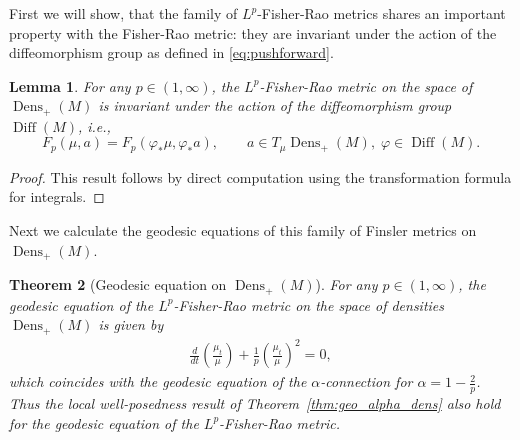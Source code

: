 \documentclass[11pt]{amsart}
\newtheorem{theorem}{Theorem}[section]
\newtheorem{lemma}[theorem]{Lemma}
\theoremstyle{definition}
\newcommand{\Dens}{\operatorname{Dens}_+(M)}
\newcommand{\Diff}{\operatorname{Diff}(M)}
\begin{document}
First we will show, that the family of $L^p$-Fisher-Rao metrics shares an important property with the Fisher-Rao metric: they are invariant under the action of the diffeomorphism group as defined in \eqref{eq:pushforward}.
\begin{lemma}\label{lem:invariance}
For any $p\in(1,\infty)$, the $L^p$-Fisher-Rao metric on the space of $\Dens$ is invariant under the action of the diffeomorphism group $\Diff$, i.e.,
\begin{equation}
F_p(\mu,a)=F_p(\varphi_*\mu,\varphi_*a),\qquad a\in T_\mu \Dens,\;\varphi\in\Diff.
\end{equation}
\end{lemma}
\begin{proof}
This result follows by direct computation using the transformation formula for integrals.
\end{proof}


Next we calculate the geodesic equations of this family of Finsler metrics on 
$\Dens$.
\begin{theorem}[Geodesic equation on $\Dens$]\label{thm:geo_lp_dens}
For any $p\in(1,\infty)$, the geodesic equation of the $L^p$-Fisher-Rao metric on the space of densities $\Dens$ is given by
\begin{align}\label{eq:geodesicDens} 
\frac{d}{dt}\left(\frac{\mu_t}{\mu}\right)+\frac{1}{p}\left(\frac{\mu_t}{\mu}\right)^2=0,
\end{align}
which coincides with the geodesic equation of the $\alpha$-connection for $\alpha=1-\frac{2}{p}$.
Thus the local well-posedness result of Theorem~\ref{thm:geo_alpha_dens} also hold for the geodesic equation of the $L^p$-Fisher-Rao metric.
\end{theorem}
\end{document}
